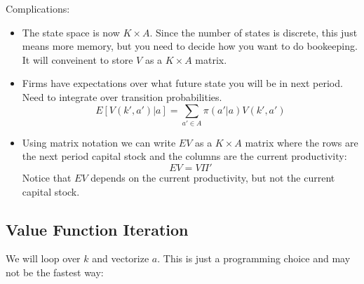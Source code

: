 \documentclass[twoside]{article}
\begin{document}
Complications: 
\begin{itemize}
\item The state space is now $K \times A$. Since the number of states is discrete, this just means more memory, but you need to decide how you want to
do bookeeping. It will conveinent to store $V$ as a $K \times A$ matrix.
\item Firms have expectations over what future state you will be in next period. Need to integrate over transition probabilities. 
$$E[V(k', a')|a] = \sum_{a' \in A} \pi(a'|a)V(k', a') $$
\item Using matrix notation we can write $EV$ as a $K \times A$ matrix where the rows are the next period capital stock and the columns are the current productivity: 
$$ EV = V \Pi' $$
Notice that $EV$ depends on the current productivity, but not the current capital stock. 
\end{itemize}


\subsection{Value Function Iteration }

We will loop over $k$ and vectorize $a$. This is just a programming choice and may not be the fastest way:
\end{document}
